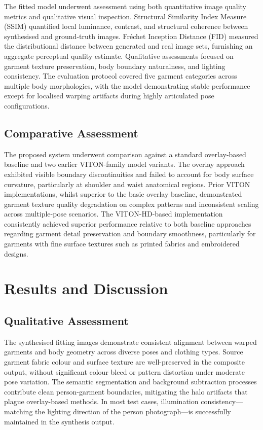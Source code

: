 \documentclass[conference]{IEEEtran}
\begin{document}
The fitted model underwent assessment using both quantitative image quality metrics and qualitative visual inspection. Structural Similarity Index Measure (SSIM) quantified local luminance, contrast, and structural coherence between synthesised and ground-truth images. Fr\'echet Inception Distance (FID) measured the distributional distance between generated and real image sets, furnishing an aggregate perceptual quality estimate. Qualitative assessments focused on garment texture preservation, body boundary naturalness, and lighting consistency. The evaluation protocol covered five garment categories across multiple body morphologies, with the model demonstrating stable performance except for localised warping artifacts during highly articulated pose configurations.

\subsection{Comparative Assessment}

The proposed system underwent comparison against a standard overlay-based baseline and two earlier VITON-family model variants. The overlay approach exhibited visible boundary discontinuities and failed to account for body surface curvature, particularly at shoulder and waist anatomical regions. Prior VITON implementations, whilst superior to the basic overlay baseline, demonstrated garment texture quality degradation on complex patterns and inconsistent scaling across multiple-pose scenarios. The VITON-HD-based implementation consistently achieved superior performance relative to both baseline approaches regarding garment detail preservation and boundary smoothness, particularly for garments with fine surface textures such as printed fabrics and embroidered designs.

\section{Results and Discussion}

\subsection{Qualitative Assessment}

The synthesised fitting images demonstrate consistent alignment between warped garments and body geometry across diverse poses and clothing types. Source garment fabric colour and surface texture are well-preserved in the composite output, without significant colour bleed or pattern distortion under moderate pose variation. The semantic segmentation and background subtraction processes contribute clean person-garment boundaries, mitigating the halo artifacts that plague overlay-based methods. In most test cases, illumination consistency—matching the lighting direction of the person photograph—is successfully maintained in the synthesis output.
\end{document}
